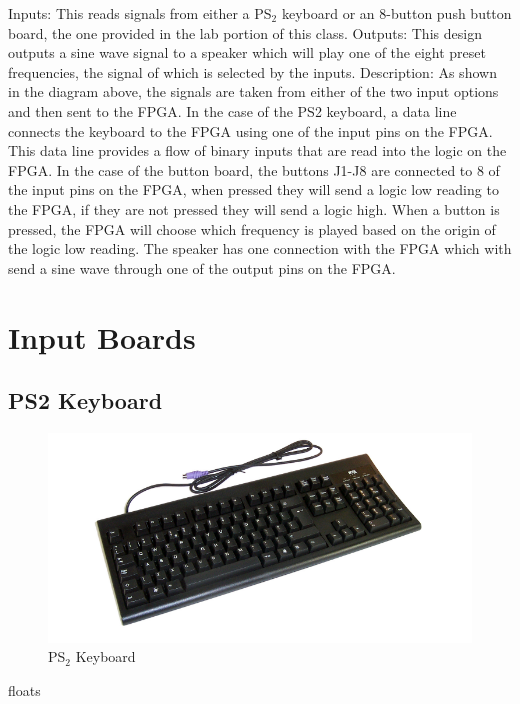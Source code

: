 \documentclass[a4paper]{article}
\begin{document}
Inputs: This reads signals from either a PS${_2}$ keyboard or an 8-button push button board, the one provided in the lab portion of this class. \newline\newline\newline
Outputs: This design outputs a sine wave signal to a speaker which will play one of the eight preset frequencies, the signal of which is selected by the inputs. 
\newline\newline
Description: As shown in the diagram above, the signals are taken from either of the two input options and then sent to the FPGA. In the case of the PS2 keyboard, a data line connects the keyboard to the FPGA using one of the input pins on the FPGA. This data line provides a flow of binary inputs that are read into the logic on the FPGA. In the case of the button board, the buttons J1-J8 are connected to 8 of the input pins on the FPGA, when pressed they will send a logic low reading to the FPGA, if they are not pressed they will send a logic high. When a button is pressed, the FPGA will choose which frequency is played based on the origin of the logic low reading. The speaker has one connection with the FPGA which with send a sine wave through one of the output pins on the FPGA. 


\section{Input Boards}

\subsection{PS2 Keyboard}

\begin{figure}[h]
    \includegraphics[width=6 in]{Images/ps2keyboard.png}
    \caption{PS${_2}$ Keyboard}
    \label{fig:2}
\end{figure} {floats}
\end{document}
